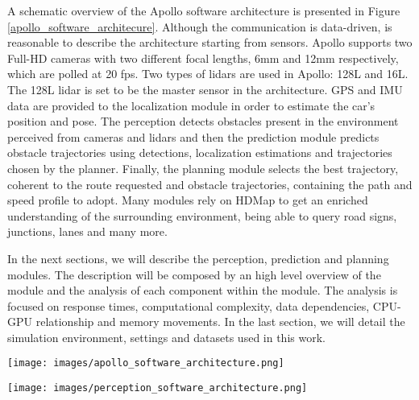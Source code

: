 \documentclass[conference]{IEEEtran}
\begin{document}
A schematic overview of the Apollo software architecture is presented in Figure \ref{apollo_software_architecure}.
Although the communication is data-driven, is reasonable to describe the architecture starting from sensors.
Apollo supports two Full-HD cameras with two different focal lengths, 6mm and 12mm respectively, which are polled at 20 fps.
Two types of lidars are used in Apollo: 128L and 16L. The 128L lidar is set to be the master sensor in the architecture.
GPS and IMU data are provided to the localization module in order to estimate the car's position and pose.
The perception detects obstacles present in the environment perceived from cameras and lidars and then the prediction module predicts obstacle trajectories using detections, localization estimations and trajectories chosen by the planner.
Finally, the planning module selects the best trajectory, coherent to the route requested and obstacle trajectories, containing the path and speed profile to adopt.
Many modules rely on HDMap to get an enriched understanding of the surrounding environment, being able to query road signs, junctions, lanes and many more. 

In the next sections, we will describe the perception, prediction and planning modules.
The description will be composed by an high level overview of the module and the analysis of each component within the module.
The analysis is focused on response times, computational complexity, data dependencies, CPU-GPU relationship and memory movements.
In the last section, we will detail the simulation environment, settings and datasets used in this work.

\begin{figure*}[t]
    \centering
    \texttt{[image: images/apollo\_software\_architecture.png]}
    \caption{Apollo Software Architecture}
    \label{apollo_software_architecure}
\end{figure*}


\begin{figure*}[b!]
    \centering
    \texttt{[image: images/perception\_software\_architecture.png]}
    \caption{Perception Software Architecture}
    \label{perception_software_architecture}
\end{figure*}
\end{document}
